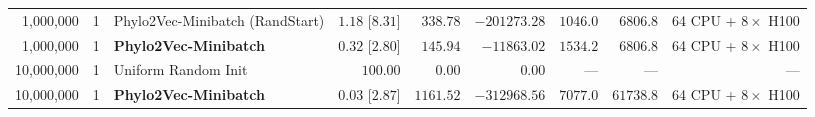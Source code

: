 \begin{table}[!htbp]
{\begin{tabular}{@{}rrlrrrrrr@{}}
1,000,000 & 1 & Phylo2Vec-Minibatch (RandStart) & $1.18$ [$8.31$] & $338.78$ & $-201273.28$ & $\mathbf{1046.0}$ & $\mathbf{6806.8}$ & 64 CPU + $8\times$ H100\\
1,000,000 & 1 & \textbf{Phylo2Vec-Minibatch} & $\mathbf{0.32}$ [$\mathbf{2.80}$] & $\mathbf{145.94}$ & $-11863.02$ & $1534.2$ & $\mathbf{6806.8}$ & 64 CPU + $8\times$ H100\\
\midrule
10,000,000 & 1 & Uniform Random Init & $100.00$ & $0.00$ & $0.00$ & --- & --- & ---\\
10,000,000 & 1 & \textbf{Phylo2Vec-Minibatch} & $\mathbf{0.03}$ [$\mathbf{2.87}$] & $\mathbf{1161.52}$ & $-312968.56$ & $\mathbf{7077.0}$ & $61738.8$ & 64 CPU + $8\times$ H100\\
\bottomrule
\end{tabular}%
}
\end{table}

